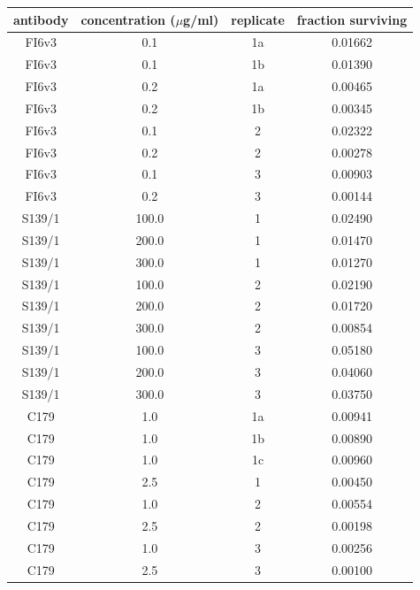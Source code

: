\documentclass[11pt]{article}
\begin{document}
\begin{supptable}
\centering
\begin{tabular}{cccc}
antibody &  concentration ($\mu$g/ml) &  replicate &  fraction surviving \\
\hline
FI6v3 &            0.1 &  1a &             0.01662 \\
 FI6v3 &            0.1 &  1b &             0.01390 \\
FI6v3 &            0.2 &  1a &             0.00465 \\
FI6v3 &            0.2 &  1b &             0.00345 \\
FI6v3 &            0.1 &  2 &             0.02322 \\
FI6v3 &            0.2 &  2 &             0.00278 \\
FI6v3 &            0.1 &  3 &             0.00903 \\
FI6v3 &            0.2 &  3 &             0.00144 \\
S139/1 &          100.0 &  1 &             0.02490 \\
S139/1 &          200.0 &  1 &             0.01470 \\
S139/1 &          300.0 &  1 &             0.01270 \\
S139/1 &          100.0 &  2 &             0.02190 \\
S139/1 &          200.0 &  2 &             0.01720 \\
S139/1 &          300.0 &  2 &             0.00854 \\
S139/1 &          100.0 &  3 &             0.05180 \\
S139/1 &          200.0 &  3 &             0.04060 \\
S139/1 &          300.0 &  3 &             0.03750 \\
C179 &            1.0 &    1a &             0.00941 \\
C179 &            1.0 &    1b &             0.00890 \\
C179 &            1.0 &    1c &             0.00960 \\
C179 &            2.5 &    1 &             0.00450 \\
C179 &            1.0 &    2 &             0.00554 \\
C179 &            2.5 &    2 &             0.00198 \\
C179 &            1.0 &    3 &             0.00256 \\
C179 &            2.5 &    3 &             0.00100 \\
\end{tabular}
\caption{\label{supptab:fracsurvive}
{\bf The total fraction of virions surviving each antibody treatment at each concentration as estimated by qPCR.}
These are the quantities referred to as $\gamma$.
This table shows the values for the broad antibodies; values for the narrow H17-L17, H17-L10, and H17-L7 antibodies have been reported previously\cite{doud2017complete}.
}
\end{supptable}
\clearpage
\end{document}
